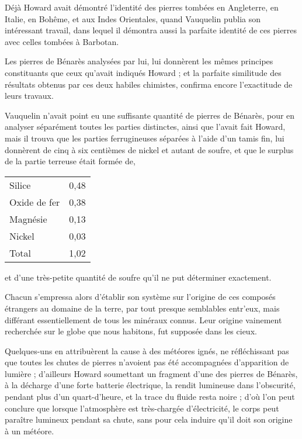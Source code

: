 \documentclass[a4paper, 12pt, oneside, french]{article}
\begin{document}
Déjà Howard avait démontré l'identité des pierres tombées en Angleterre, en Italie, en Bohême, et aux Indes Orientales, quand Vauquelin publia son intéressant travail, dans lequel il démontra aussi la parfaite identité de ces pierres avec celles tombées à Barbotan.

Les pierres de Bénarès analysées par lui, lui donnèrent les mêmes principes constituants que ceux qu'avait indiqués Howard ; et la parfaite similitude des résultats obtenus par ces deux habiles chimistes, confirma encore l'exactitude de leurs travaux.

Vauquelin n'avait point eu une suffisante quantité de pierres de Bénarès, pour en analyser séparément toutes les parties distinctes, ainsi que l'avait fait Howard, mais il trouva que les parties ferrugineuses séparées à l'aide d'un tamis fin, lui donnèrent de cinq à six centièmes de nickel et autant de soufre, et que le surplus de la partie terreuse était formée de,
\begin{table}[H]
    \centering
    \begin{tabular}{l r}
        Silice & 0,48 \\
        Oxide de fer & 0,38 \\
        Magnésie & 0,13 \\
        Nickel & 0,03 \\ \hline
        Total & 1,02 \\
    \end{tabular}
\end{table}
et d'une très-petite quantité de soufre qu'il ne put déterminer exactement.

Chacun s'empressa alors d'établir son système sur l'origine de ces composés étrangers au domaine de la terre, par tout presque semblables entr'eux, mais différant essentiellement de tous les minéraux connus. Leur origine vainement recherchée sur le globe que nous habitons, fut supposée dans les cieux.

Quelques-uns en attribuèrent la cause à des météores ignés, ne réfléchissant pas que toutes les chutes de pierres n'avoient pas été accompagnées d'apparition de lumière ; d'ailleurs Howard soumettant un fragment d'une des pierres de Bénarès, à la décharge d'une forte batterie électrique, la rendit lumineuse dans l'obscurité, pendant plus d'un quart-d'heure, et la trace du fluide resta noire ; d'où l'on peut conclure que lorsque l'atmosphère est très-chargée d'électricité, le corps peut paraître lumineux pendant sa chute, sans pour cela induire qu'il doit son origine à un météore.
\end{document}
